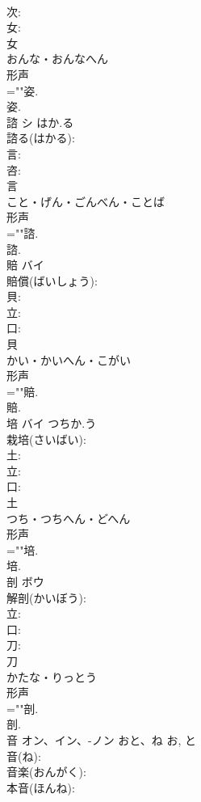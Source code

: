 \documentclass[8pt]{extreport}
\begin{document}
\begin{CJK}{UTF8}{min}
\\	次: 
\\	女: 
\\	女	
\\	おんな・おんなへん	
\\	形声 
\\	=""姿.
\\	姿.
\\	諮	シ	はか.る		
\\	諮る(はかる): 
\\	言: 
\\	咨: 
\\	言	
\\	こと・げん・ごんべん・ことば	
\\	形声 
\\	=""諮.
\\	諮.
\\	賠	バイ			
\\	賠償(ばいしょう): 
\\	貝: 
\\	立: 
\\	口: 
\\	貝	
\\	かい・かいへん・こがい	
\\	形声 
\\	=""賠.
\\	賠.
\\	培	バイ	つちか.う		
\\	栽培(さいばい): 
\\	土: 
\\	立: 
\\	口: 
\\	土	
\\	つち・つちへん・どへん	
\\	形声 
\\	=""培.
\\	培.
\\	剖	ボウ			
\\	解剖(かいぼう): 
\\	立: 
\\	口: 
\\	刀: 
\\	刀	
\\	かたな・りっとう	
\\	形声 
\\	=""剖.
\\	剖.
\\	音	オン、イン、-ノン	おと、ね	お, と	
\\	音(ね): 
\\	音楽(おんがく): 
\\	本音(ほんね): 

\end{CJK}
\end{document}
